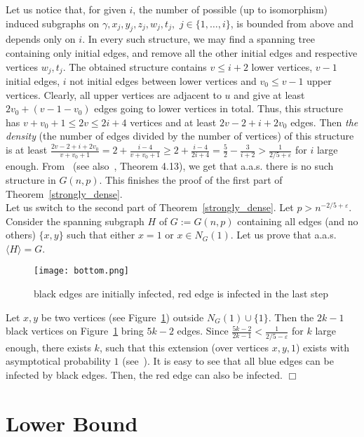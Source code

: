 \documentclass[]{article}
\begin{document}
Let us notice that, for given $i$, the number of possible (up to isomorphism) induced subgraphs on $\gamma,x_j,y_j,z_j,w_j,t_j,$ $j\in\{1,\ldots,i\}$, is bounded from above and depends only on $i$. In every such structure, we may find a spanning tree containing only initial edges, and remove all the other initial edges and respective vertices $w_j,t_j$. The obtained structure contains $v\leq i+2$ lower vertices, $v-1$ initial edges, $i$ not initial edges between lower vertices and $v_0\leq v-1$ upper vertices. Clearly, all upper vertices are adjacent to $u$ and give at least $2v_0+(v-1-v_0)$ edges going to lower vertices in total. Thus, this structure has $v+v_0+1\leq 2v\leq 2i+4$ vertices and at least $2v-2+i+2v_0$ edges. Then {\it the density} (the number of edges divided by the number of vertices) of this structure is at least $\frac{2v-2+i+2v_0}{v+v_0+1}=2+\frac{i-4}{v+v_0+1}\geq 2+\frac{i-4}{2i+4}=\frac{5}{2}-\frac{3}{i+2}>\frac{1}{2/5+\varepsilon}$ for $i$ large enough. From~\cite{Bol_small,Vince} (see also~\cite{Bollobas}, Theorem 4.13), we get that a.a.s. there is no such structure in $G(n,p)$. This finishes the proof of the first part of Theorem~\ref{strongly_dense}.\\

Let us switch to the second part of Theorem~\ref{strongly_dense}. Let $p>n^{-2/5+\varepsilon}$. Consider the spanning subgraph $H$ of $G:=G(n,p)$ containing all edges (and no others) $\{x,y\}$ such that either $x=1$ or $x\in N_G(1)$. Let us prove that a.a.s. $\langle H\rangle =G$. 

\begin{figure}[h]
\begin{center}
\texttt{[image: bottom.png]}
\end{center}
\caption{black edges are initially infected, red edge is infected in the last step}
\label{Fig}
\end{figure}

Let $x,y$ be two vertices (see Figure~\ref{Fig}) outside $N_G(1)\cup\{1\}$. Then the $2k-1$ black vertices on Figure~\ref{Fig} bring $5k-2$ edges. Since $\frac{5k-2}{2k-1}<\frac{1}{2/5-\varepsilon}$ for $k$ large enough, there exists $k$, such that this extension (over vertices $x,y,1$) exists with asymptotical probability $1$ (see~\cite{Spencer_extensions}). It is easy to see that all blue edges can be infected by black edges. Then, the red edge can also be infected. $\Box$



\section{Lower Bound}
\label{lower}
\end{document}
